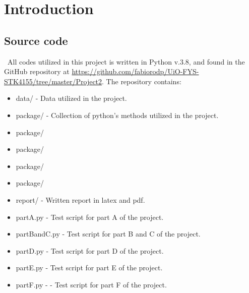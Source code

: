 \section{Introduction}
\label{chap:Introduction}


\subsection{Source code}
\label{chap:Source code}

\qquad \, All codes utilized in this project is written in Python v.3.8, and found in the GitHub repository at \href{https://github.com/fabiorodp/UiO-FYS-STK4155/tree/master/Project2}{https://github.com/fabiorodp/UiO-FYS-STK4155/tree/master/Project2}. The repository contains:

\begin{itemize}
\item data/ - Data utilized in the project.
\item package/ - Collection of python's methods utilized in the project.
\item package/
\item package/
\item package/
\item package/
\item report/ - Written report in latex and pdf.
\item partA.py - Test script for part A of the project.
\item partBandC.py - Test script for part B and C of the project.
\item partD.py - Test script for part D of the project.
\item partE.py - Test script for part E of the project.
\item partF.py - - Test script for part F of the project.
\end{itemize}

